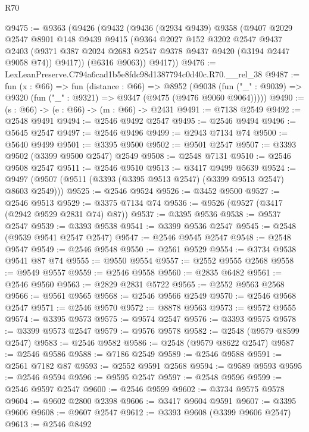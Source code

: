 \begin{lexlean}{R70}
\begin{coremodule}
@9475 := @9363
    (@9426
      (@9432
        (@9436
          (@2934 @9439)
          @9358
          (@9407
            @2029
            @2547
            @8901
            @148
            @9439
            @9415
            (@9364
              @2027
              @152
              @3202
              @2547
              @9437
              @2403
              (@9371 @387 @2024 @2683 @2547 @9378 @9437 @9420 (@3194 @2447 @9058 @74))
              @9417))
          (@6316 @9063))
        @9417))
@9476 := LexLeanPreserve.C794a6cad1b5e8fdc98d1387794c0d40c.R70.__rel_38
@9487 := fun (x : @66) =>
  fun (distance : @66) =>
  @8952
    (@9038 (fun ("_" : @9039) => @9320 (fun ("_" : @9321) => @9347 (@9475 (@9476 @9060 @9064)))))
@9490 := (s : @66) -> (e : @66) -> (m : @66) -> @2431
@9491 := @7138 @2549
@9492 := @2548 @9491
@9494 := @2546 @9492 @2547
@9495 := @2546 @9494
@9496 := @5645 @2547
@9497 := @2546 @9496
@9499 := @2943 @7134 @74
@9500 := @5640 @9499
@9501 := @3395 @9500
@9502 := @9501 @2547
@9507 := @3393 @9502 (@3399 @9500 @2547) @2549
@9508 := @2548 @7131
@9510 := @2546 @9508 @2547
@9511 := @2546 @9510
@9513 := @3417 @9499 @5639
@9524 := @9497 (@9507 (@9511 (@3393 (@3395 @9513 @2547) (@3399 @9513 @2547) @8603 @2549)))
@9525 := @2546 @9524
@9526 := @3452 @9500
@9527 := @2546 @9513
@9529 := @3375 @7134 @74
@9536 := @9526 (@9527 (@3417 (@2942 @9529 @2831 @74) @87))
@9537 := @3395 @9536
@9538 := @9537 @2547
@9539 := @3393 @9538
@9541 := @3399 @9536 @2547
@9545 := @2548 (@9539 @9541 @2547 @2547)
@9547 := @2546 @9545 @2547
@9548 := @2548 @9547
@9549 := @2546 @9548
@9550 := @2561 @9529
@9554 := @3734 @9538 @9541 @87 @74
@9555 := @9550 @9554
@9557 := @2552 @9555 @2568
@9558 := @9549 @9557
@9559 := @2546 @9558
@9560 := @2835 @6482
@9561 := @2546 @9560
@9563 := @2829 @2831 @5722
@9565 := @2552 @9563 @2568
@9566 := @9561 @9565
@9568 := @2546 @9566 @2549
@9570 := @2546 @9568 @2547
@9571 := @2546 @9570
@9572 := @8878 @9563
@9573 := @9572 @9555
@9574 := @3395 @9573
@9575 := @9574 @2547
@9576 := @3393 @9575
@9578 := @3399 @9573 @2547
@9579 := @9576 @9578
@9582 := @2548 (@9579 @8599 @2547)
@9583 := @2546 @9582
@9586 := @2548 (@9579 @8622 @2547)
@9587 := @2546 @9586
@9588 := @7186 @2549
@9589 := @2546 @9588
@9591 := @2561 @7182 @87
@9593 := @2552 @9591 @2568
@9594 := @9589 @9593
@9595 := @2546 @9594
@9596 := @9595 @2547
@9597 := @2548 @9596
@9599 := @2546 @9597 @2547
@9600 := @2546 @9599
@9602 := @3734 @9575 @9578
@9604 := @9602 @2800 @2398
@9606 := @3417 @9604 @9591
@9607 := @3395 @9606
@9608 := @9607 @2547
@9612 := @3393 @9608 (@3399 @9606 @2547)
@9613 := @2546 @8492

\end{coremodule}
\end{lexlean}
